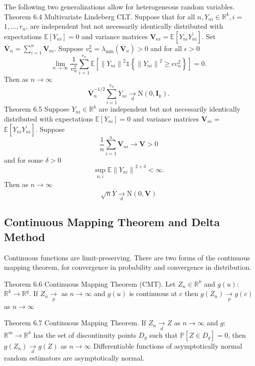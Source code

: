 \documentclass[10pt]{article}
\begin{document}
The following two generalizations allow for heterogeneous random variables. Theorem 6.4 Multivariate Lindeberg CLT. Suppose that for all $n, Y_{n i} \in \mathbb{R}^{k}, i=$ $1, \ldots, r_{n}$, are independent but not necessarily identically distributed with expectations $\mathbb{E}\left[Y_{n i}\right]=0$ and variance matrices $\boldsymbol{V}_{n i}=\mathbb{E}\left[Y_{n i} Y_{n i}^{\prime}\right]$. Set $\overline{\boldsymbol{V}}_{n}=\sum_{i=1}^{n} \boldsymbol{V}_{n i}$. Suppose $v_{n}^{2}=\lambda_{\min }\left(\overline{\boldsymbol{V}}_{n}\right)>0$ and for all $\epsilon>0$
$$
\lim _{n \rightarrow \infty} \frac{1}{v_{n}^{2}} \sum_{i=1}^{r_{n}} \mathbb{E}\left[\left\|Y_{n i}\right\|^{2} \mathbb{1}\left\{\left\|Y_{n i}\right\|^{2} \geq \epsilon v_{n}^{2}\right\}\right]=0 .
$$
Then as $n \rightarrow \infty$
$$
\overline{\boldsymbol{V}}_{n}^{-1 / 2} \sum_{i=1}^{r_{n}} Y_{n i} \underset{d}{\longrightarrow} \mathrm{N}\left(0, \boldsymbol{I}_{k}\right) .
$$
Theorem 6.5 Suppose $Y_{n i} \in \mathbb{R}^{k}$ are independent but not necessarily identically distributed with expectations $\mathbb{E}\left[Y_{n i}\right]=0$ and variance matrices $\boldsymbol{V}_{n i}=$ $\mathbb{E}\left[Y_{n i} Y_{n i}^{\prime}\right]$. Suppose
$$
\frac{1}{n} \sum_{i=1}^{n} \boldsymbol{V}_{n i} \rightarrow \boldsymbol{V}>0
$$
and for some $\delta>0$
$$
\sup _{n, i} \mathbb{E}\left\|Y_{n i}\right\|^{2+\delta}<\infty .
$$
Then as $n \rightarrow \infty$
$$
\sqrt{n} \bar{Y} \underset{d}{\longrightarrow} \mathrm{N}(0, \boldsymbol{V})
$$

\subsection{Continuous Mapping Theorem and Delta Method}
Continuous functions are limit-preserving. There are two forms of the continuous mapping theorem, for convergence in probability and convergence in distribution.

Theorem 6.6 Continuous Mapping Theorem (CMT). Let $Z_{n} \in \mathbb{R}^{k}$ and $g(u):$ $\mathbb{R}^{k} \rightarrow \mathbb{R}^{q}$. If $Z_{n} \underset{p}{\longrightarrow}$ as $n \rightarrow \infty$ and $g(u)$ is continuous at $c$ then $g\left(Z_{n}\right) \underset{p}{\longrightarrow} g(c)$ as $n \rightarrow \infty$

Theorem 6.7 Continuous Mapping Theorem. If $Z_{n} \underset{d}{\longrightarrow} Z$ as $n \rightarrow \infty$ and $g:$ $\mathbb{R}^{m} \rightarrow \mathbb{R}^{k}$ has the set of discontinuity points $D_{g}$ such that $\mathbb{P}\left[Z \in D_{g}\right]=0$, then $g\left(Z_{n}\right) \underset{d}{\longrightarrow} g(Z)$ as $n \rightarrow \infty$ Differentiable functions of asymptotically normal random estimators are asymptotically normal.
\end{document}
